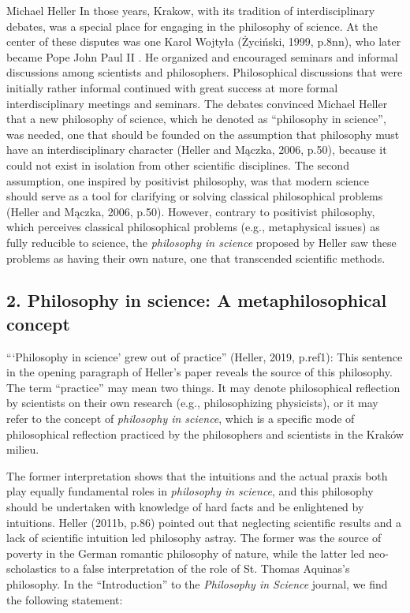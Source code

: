 \begin{artengenv}{Michael Heller}
In those years, Krakow, with its tradition of interdisciplinary debates, was a special place for engaging in the
philosophy of science. At the center of these disputes was one Karol Wojtyła (Życiński, 1999, p.8nn), who later became
Pope John Paul II . He organized and encouraged seminars and informal discussions among scientists and philosophers.
Philosophical discussions that were initially rather informal continued with great success at more formal
interdisciplinary meetings and seminars. The debates convinced Michael Heller that a new philosophy of science, which
he denoted as “philosophy in science”, was needed, one that should be founded on the assumption that philosophy must
have an interdisciplinary character (Heller and Mączka, 2006, p.50), because it could not exist in isolation from other
scientific disciplines. The second assumption, one inspired by positivist philosophy, was that modern science should
serve as a tool for clarifying or solving classical philosophical problems (Heller and Mączka, 2006, p.50). However,
contrary to positivist philosophy, which perceives classical philosophical problems (e.g., metaphysical issues) as
fully reducible to science, the \textit{philosophy in science }proposed by Heller saw these problems as having their
own nature, one that transcended scientific methods.

\subsection{2. Philosophy in science: A metaphilosophical concept}
“‘Philosophy in science’ grew out of practice” (Heller, 2019, p.ref1): This sentence in the opening paragraph of
Heller’s paper reveals the source of this philosophy. The term “practice” may mean two things. It may denote
philosophical reflection by scientists on their own research (e.g., philosophizing physicists), or it may refer to the
concept of \textit{philosophy in science}, which is a specific mode of philosophical reflection practiced by the
philosophers and scientists in the Kraków milieu. 

The former interpretation shows that the intuitions and the actual praxis both play equally fundamental roles in
\textit{philosophy in science}, and this philosophy should be undertaken with knowledge of hard facts and be
enlightened by intuitions. Heller (2011b, p.86) pointed out that neglecting scientific results and a lack of scientific
intuition led philosophy astray. The former was the source of poverty in the German romantic philosophy of nature,
while the latter led neo-scholastics to a false interpretation of the role of St. Thomas Aquinas’s philosophy. In the
“Introduction” to the \textit{Philosophy in Science }journal, we find the following statement:


\end{artengenv}
